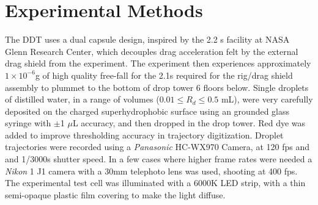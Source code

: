 \documentclass[12pt,a4paper,oneside]{book}
\begin{document}
\section{Experimental Methods}
The DDT uses a dual capsule design, inspired by the 2.2 s facility at NASA Glenn Research Center, which decouples drag acceleration felt by the external drag shield from the experiment. The experiment then experiences approximately $1 \times 10^{-6}$g of high quality free-fall for the 2.1s required for the rig/drag shield assembly to plummet to the bottom of drop tower 6 floors below. Single droplets of distilled water, in a range of volumes ($0.01 \leq R_d \leq 0.5$ mL), were very carefully deposited on the charged superhydrophobic surface using an grounded glass syringe with $\pm $1 $\mu$L accuracy, and then dropped in the drop tower. Red dye was added to improve thresholding accuracy in trajectory digitization. Droplet trajectories were recorded using a \emph{Panasonic} HC-WX970 Camera, at 120 fps and and 1/3000s shutter speed. In a few cases where higher frame rates were needed a \emph{Nikon} 1 J1 camera with a 30mm telephoto lens was used, shooting at 400 fps. The experimental test cell was illuminated with a 6000K LED strip, with a thin semi-opaque plastic film covering to make the light diffuse.  
\end{document}
